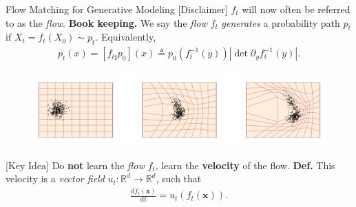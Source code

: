 \documentclass{beamer}
\begin{document}
\begin{frame}{Flow Matching for Generative Modeling \citep{lipmanFlowMatchingGenerative2023}}
    [Disclaimer]{
    \( f_t \) will now often be referred to as the \emph{flow}.
    }
    \textbf{Book keeping.} We say the \emph{flow} \( f_t \) \emph{generates} a probability path \( p_t \) if \( X_t = f_t(X_{0}) \sim p_t \). Equivalently,
    \begin{align*}
        p_t(x) = [f_{t\sharp}p_0](x) \triangleq  p_0(f_t^{-1}(y)) \left|\det \partial_y f_t^{-1}(y)\right|
    .\end{align*}
    \begin{figure}
        \centering
        \includegraphics[width=\linewidth]{figures/flow-vis.png}
    \end{figure}
\end{frame}
\begin{frame}
    [Key Idea]{
    Do \textbf{not} learn the \emph{flow} \( f_t \), learn the \textbf{velocity} of the flow.
}
\textbf{Def.} This velocity is a \emph{vector field} \( u_t : \mathbb{R}^d \to \mathbb{R}^d \), such that
\begin{align*}
    \frac{\mathrm{d}f_t(\mathbf{x})}{\mathrm{d}t} = u_t(f_t(\mathbf{x}))
.\end{align*}
\end{frame}
\end{document}
